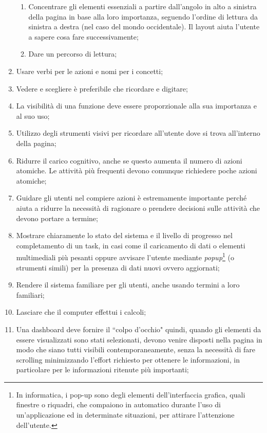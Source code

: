 \begin{enumerate}
\begin{enumerate}[label=\alph*.]
        \item Concentrare gli elementi essenziali a partire dall'angolo in alto a sinistra della pagina in base alla loro importanza, seguendo l'ordine di lettura da sinistra a destra (nel caso del mondo occidentale). Il layout aiuta l'utente a sapere cosa fare successivamente;\label{lg:5.a}
        \item Dare un percorso di lettura; \label{lg:5.b}
    \end{enumerate}
    \item Usare verbi per le azioni e nomi per i concetti; \label{lg:6}
    \item Vedere e scegliere è preferibile che ricordare e digitare;\label{lg:7}
    \item La visibilità di una funzione deve essere proporzionale alla sua importanza e al suo uso;\label{lg:8}
    \item Utilizzo degli strumenti visivi per ricordare all'utente dove si trova all'interno della pagina;\label{lg:9}
    \item Ridurre il carico cognitivo, anche se questo aumenta il numero di azioni atomiche. Le attività più frequenti devono comunque richiedere poche azioni atomiche;\label{lg:10}
    \item Guidare gli utenti nel compiere azioni è estremamente importante perché aiuta a ridurre la necessità di ragionare o prendere decisioni sulle attività che devono portare a termine;\label{lg:11}
    \item Mostrare chiaramente lo stato del sistema e il livello di progresso nel completamento di un task, in casi come il caricamento di dati o elementi multimediali più pesanti oppure avvisare l'utente mediante \textit{popup}\footnote{In informatica, i pop-up sono degli elementi dell'interfaccia grafica, quali finestre o riquadri, che compaiono in automatico durante l'uso di un'applicazione ed in determinate situazioni, per attirare l'attenzione dell'utente.} (o strumenti simili) per la presenza di dati nuovi ovvero aggiornati;\label{lg:12}
    \item Rendere il sistema familiare per gli utenti, anche usando termini a loro familiari;\label{lg:13}
    \item Lasciare che il computer effettui i calcoli;\label{lg:14}
    \item Una dashboard deve fornire il ``colpo d'occhio" quindi, quando gli elementi da essere visualizzati sono stati selezionati, devono venire disposti nella pagina in modo che siano tutti visibili contemporaneamente, senza la necessità di fare scrolling minimizzando l'effort richiesto per ottenere le informazioni, in particolare per le informazioni ritenute più importanti;\label{lg:15}

\end{enumerate}
